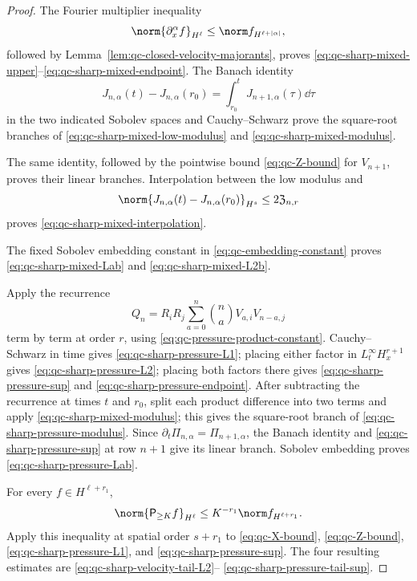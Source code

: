 {\begin{proof}
The Fourier multiplier inequality
\[
 \norm{\partial_x^\alpha f}_{H^\ell}
 \le\norm f_{H^{\ell+|\alpha|}},
\]
followed by Lemma~\ref{lem:qc-closed-velocity-majorants}, proves
\eqref{eq:qc-sharp-mixed-upper}--\eqref{eq:qc-sharp-mixed-endpoint}.
The Banach identity
\[
 J_{n,\alpha}(t)-J_{n,\alpha}(r_0)
 =\int_{r_0}^tJ_{n+1,\alpha}(\tau)\dd\tau
\]
in the two indicated Sobolev spaces and Cauchy--Schwarz prove the
square-root branches of \eqref{eq:qc-sharp-mixed-low-modulus} and
\eqref{eq:qc-sharp-mixed-modulus}.
\begin{samepage}
The same identity, followed by the
pointwise bound \eqref{eq:qc-Z-bound} for \(V_{n+1}\), proves their linear
branches.  Interpolation between the low modulus
and
\[
 \norm{J_{n,\alpha}(t)-J_{n,\alpha}(r_0)}_{H^s}
 \le2\mathfrak Z_{n,r}
\]
proves \eqref{eq:qc-sharp-mixed-interpolation}.
\end{samepage}
The fixed Sobolev embedding constant in \eqref{eq:qc-embedding-constant} proves
\eqref{eq:qc-sharp-mixed-Lab} and \eqref{eq:qc-sharp-mixed-L2b}.

Apply the recurrence
\[
 Q_n=R_iR_j\sum_{a=0}^{n}\binom naV_{a,i}V_{n-a,j}
\]
term by term at order \(r\), using
\eqref{eq:qc-pressure-product-constant}.  Cauchy--Schwarz in time gives
\eqref{eq:qc-sharp-pressure-L1}; placing either factor in
\(L_t^\infty H_x^{r+1}\) gives
\eqref{eq:qc-sharp-pressure-L2}; placing both factors there gives
\eqref{eq:qc-sharp-pressure-sup} and
\eqref{eq:qc-sharp-pressure-endpoint}.  After subtracting the recurrence at
times \(t\) and \(r_0\), split each product difference into two terms and
apply \eqref{eq:qc-sharp-mixed-modulus}; this gives the square-root branch
of \eqref{eq:qc-sharp-pressure-modulus}.  Since
\(\partial_t\Pi_{n,\alpha}=\Pi_{n+1,\alpha}\), the Banach identity and
\eqref{eq:qc-sharp-pressure-sup} at row \(n+1\) give its linear branch.
Sobolev embedding proves
\eqref{eq:qc-sharp-pressure-Lab}.

For every \(f\in H^{\ell+r_1}\),
\[
 \norm{\mathsf P_{\ge K}f}_{H^\ell}
 \le K^{-r_1}\norm f_{H^{\ell+r_1}}.
\]
Apply this inequality at spatial order \(s+r_1\) to
\eqref{eq:qc-X-bound}, \eqref{eq:qc-Z-bound},
\eqref{eq:qc-sharp-pressure-L1}, and
\eqref{eq:qc-sharp-pressure-sup}.  The four resulting estimates are
\eqref{eq:qc-sharp-velocity-tail-L2}--
\eqref{eq:qc-sharp-pressure-tail-sup}.


\end{proof}}
